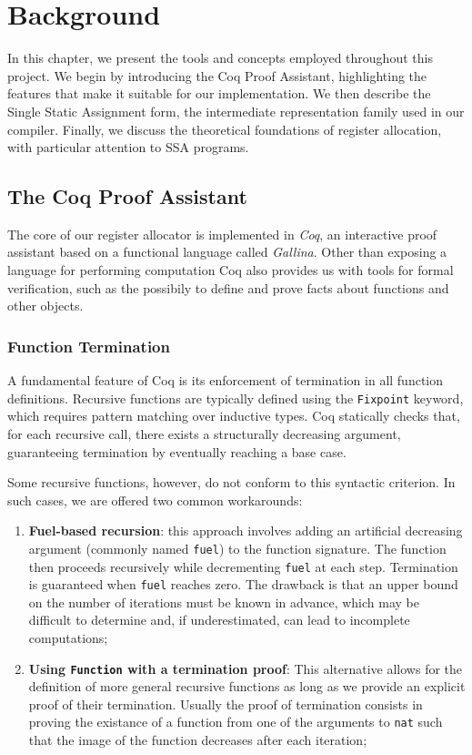 
\chapter{Background}
\label{cha:background}

In this chapter, we present the tools and concepts employed throughout this project. We begin by introducing the Coq Proof Assistant, highlighting the features that make it suitable for our implementation. We then describe the Single Static Assignment form, the intermediate representation family used in our compiler. Finally, we discuss the theoretical foundations of register allocation, with particular attention to SSA programs.

\section{The Coq Proof Assistant}

The core of our register allocator is implemented in \textit{Coq}, an interactive proof assistant based on a functional language called \textit{Gallina}. Other than exposing a language for performing computation Coq also provides us with tools for formal verification, such as the possibily to define and prove facts about functions and other objects.

\subsection{Function Termination}
\label{subsec:funterm}

A fundamental feature of Coq is its enforcement of termination in all function definitions. Recursive functions are typically defined using the \texttt{Fixpoint} keyword, which requires pattern matching over inductive types. Coq statically checks that, for each recursive call, there exists a structurally decreasing argument, guaranteeing termination by eventually reaching a base case.

Some recursive functions, however, do not conform to this syntactic criterion. In such cases, we are offered two common workarounds:

\begin{enumerate}
    \item \textbf{Fuel-based recursion}: this approach involves adding an artificial decreasing argument (commonly named \texttt{fuel}) to the function signature. The function then proceeds recursively while decrementing \texttt{fuel} at each step. Termination is guaranteed when \texttt{fuel} reaches zero. The drawback is that an upper bound on the number of iterations must be known in advance, which may be difficult to determine and, if underestimated, can lead to incomplete computations;
    \item \textbf{Using \texttt{Function} with a termination proof}: This alternative allows for the definition of more general recursive functions as long as we provide an explicit proof of their termination. Usually the proof of termination consists in proving the existance of a function from one of the arguments to \texttt{nat} such that the image of the function decreases after each iteration;
\end{enumerate}

